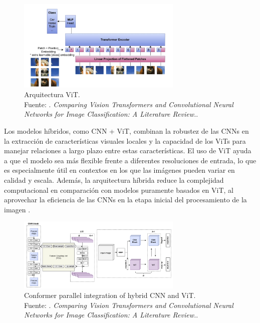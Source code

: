\begin{figure}[H]
	\begin{center}
		\includegraphics[width=0.70\textwidth]{2/figures/vit arquitechture.png}
		\caption[Arquitectura ViT]{Arquitectura ViT. \\
		Fuente: \cite{app13095521}. \textit{Comparing Vision Transformers and Convolutional Neural Networks for Image Classification: A Literature Review.}.}
		\label{2:fig211}
	\end{center}
\end{figure}


Los modelos híbridos, como CNN + ViT, combinan la robustez de las CNNs en la extracción de características visuales locales y la capacidad de los ViTs para manejar relaciones a largo plazo entre estas características. El uso de ViT ayuda a que el modelo sea más flexible frente a diferentes resoluciones de entrada, lo que es especialmente útil en contextos en los que las imágenes pueden variar en calidad y escala. Además, la arquitectura híbrida reduce la complejidad computacional en comparación con modelos puramente basados en ViT, al aprovechar la eficiencia de las CNNs en la etapa inicial del procesamiento de la imagen \parencite{yunusa2024exploringsynergieshybridcnns}.

\begin{figure}[H]
	\begin{center}
		\includegraphics[width=0.70\textwidth]{2/figures/cnn+vitarquitechture.png}
		\caption[Conformer parallel integration of hybrid CNN and ViT]{Conformer parallel integration of hybrid CNN and ViT. \\
		Fuente: \cite{app13095521}. \textit{Comparing Vision Transformers and Convolutional Neural Networks for Image Classification: A Literature Review.}.}
		\label{2:fig211}
	\end{center}
\end{figure}



